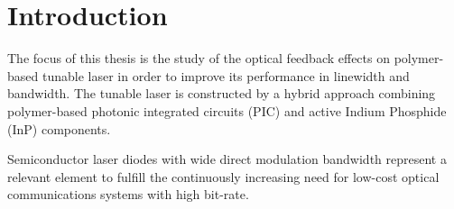 \chapter{Introduction}
\label{ch:Introduction}
The focus of this thesis is the study of the optical feedback effects on polymer-based tunable laser in order to improve its performance in linewidth and bandwidth. The tunable laser is constructed by a hybrid approach combining polymer-based photonic integrated circuits (PIC) and active Indium Phosphide (InP) components.


Semiconductor laser diodes with wide direct modulation bandwidth represent a relevant element to fulfill the continuously increasing need for low-cost optical communications systems with high bit-rate.


